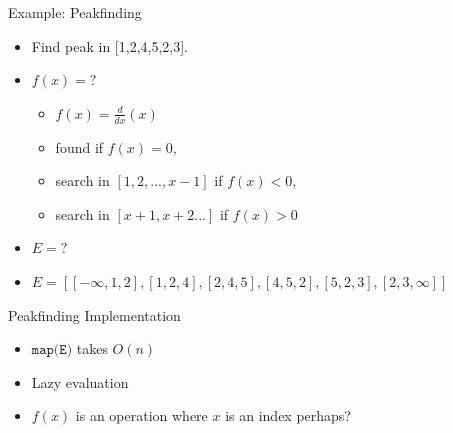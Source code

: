 \documentclass[presentation]{beamer}
\begin{document}
\begin{frame}[<+->][label={sec:org8024717}]{Example: Peakfinding}
\begin{itemize}
\item Find \alert{peak} in [1,2,4,5,2,3].
\item \(f(x) = ?\)
\begin{itemize}
\item \(f(x) = \frac{d}{dx}(x)\)
\item found if \(f(x) = 0\),
\item search in \([1,2,...,x - 1]\) if \(f(x) < 0\),
\item search in \([x + 1, x+2...]\) if \(f(x) > 0\)
\end{itemize}
\item \(E = ?\)
\item \(E = [[-\infty, 1, 2], [1,2,4], [2,4,5], [4,5,2],[5,2,3],[2,3,\infty]]\)
\end{itemize}
\end{frame}
\begin{frame}[<+->][label={sec:orga3167d5}]{Peakfinding Implementation}
\begin{itemize}
\item \(\texttt{map(E)}\) takes \(O(n)\)
\item Lazy evaluation
\item \(f(x)\) is an operation where \(x\) is an index perhaps?
\end{itemize}
\end{frame}
\end{document}
